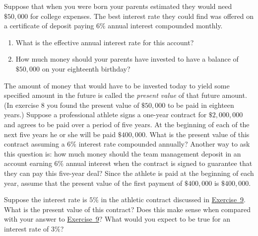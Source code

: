 \documentclass[10pt,]{book}
\theoremstyle{ptxdefinitionnotitle}
\theoremstyle{ptxdefinitiontitle}
\theoremstyle{ptxdefinitionnotitle}
\theoremstyle{ptxdefinitiontitle}
\theoremstyle{ptxdefinitionnotitle}
\theoremstyle{ptxdefinitiontitle}
\numberwithin{equation}{section}
\begin{document}
\begin{divisionexercise}{8}\hypertarget{exercise-57}{}
\hypertarget{p-229}{}%
Suppose that when you were born your parents estimated they would need \(\$50,000\) for college expenses.  The best interest rate they could find was offered on a certificate of deposit paying \(6\%\) annual interest compounded monthly.%
\leavevmode%
\begin{enumerate}[label=(\alph*)]
\item\hypertarget{li-114}{}What is the effective annual interest rate for this account?%
\item\hypertarget{li-115}{}How much money should your parents have invested to have a balance of \(\$50,000\) on your eighteenth birthday?%
\end{enumerate}
\end{divisionexercise}%
\begin{divisionexercise}{9}\hypertarget{athletic-contract}{}
\hypertarget{p-230}{}%
The amount of money that would have to be invested today to yield some specified amount in the future is called the \emph{present value} of that future amount.  (In exercise 8 you found the present value of \(\$50,000\) to be paid in eighteen years.)  Suppose a professional athlete signs a one-year contract for \(\$2,000,000\) and agrees to be paid over a period of five years.  At the beginning of each of the next five years he or she will be paid \(\$400,000\).  What is the present value of this contract assuming a \(6\%\) interest rate compounded annually?  Another way to ask this question is: how much money should the team management deposit in an account earning \(6\%\) annual interest when the contract is signed to guarantee that they can pay this five-year deal?  Since the athlete is paid at the beginning of each year, assume that the present value of the first payment of \(\$400,000\) is \(\$400,000\).%
\end{divisionexercise}%
\begin{divisionexercise}{10}\hypertarget{exercise-59}{}
\hypertarget{p-231}{}%
Suppose the interest rate is \(5\%\) in the athletic contract discussed in \hyperlink{athletic-contract}{Exercise~9}.  What is the present value of this contract?  Does this make sense when compared with your answer to \hyperlink{athletic-contract}{Exercise~9}?  What would you expect to be true for an interest rate of \(3\%\)?%
\end{divisionexercise}%
\typeout{************************************************}
\typeout{************************************************}
\end{document}
